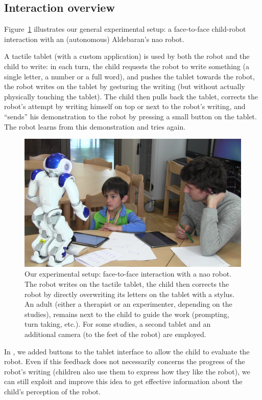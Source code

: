 \documentclass[10pt,a4paper]{article}
\begin{document}
\subsection{Interaction overview}
Figure~\ref{experimental_setup} illustrates our general experimental setup: a
face-to-face child-robot interaction with an (autonomous) Aldebaran's {\sc nao}
robot.

A tactile tablet (with a custom application) is used by both the robot and the
child to write: in each turn, the child requests the robot to write
something (a single letter, a number or a full word), and pushes the tablet
towards the robot, the robot writes on the tablet by gesturing the writing (but
without actually physically touching the tablet). The child then pulls back the
tablet, corrects the robot's attempt by writing himself on top or next to
the robot's writing, and ``sends'' his
demonstration to the robot by pressing a small button on the tablet. The robot
learns from this demonstration and tries again.


   \begin{figure}
       \centering
       \includegraphics[width=0.6\columnwidth]{realSetup}
       \caption{\small Our experimental setup: face-to-face interaction with a {\sc
           nao} robot.  The robot writes on the tactile tablet, the child then
           corrects the robot by directly overwriting its letters on the tablet
           with a stylus. An adult (either a therapist or an experimenter,
           depending on the studies), remains next to the child to guide the work
           (prompting, turn taking, etc.). For some studies, a second tablet and an
           additional camera (to the feet of the robot) are employed.}

       \label{experimental_setup}
   \end{figure}
   
In \cite{jacq2016building}, we added buttons to the tablet interface to allow the child to evaluate the robot. Even if this feedback does not necessarily concerns the progress of the robot's writing (children also use them to express how they like the robot), we can still exploit and improve this idea to get effective information about the child's perception of the robot.
   
\end{document}
